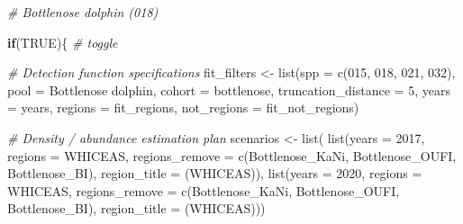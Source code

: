 \documentclass[
]{book}
\newenvironment{Shaded}{\begin{snugshade}}{\end{snugshade}}
\newcommand{\AttributeTok}[1]{\textcolor[rgb]{0.77,0.63,0.00}{#1}}
\newcommand{\CommentTok}[1]{\textcolor[rgb]{0.56,0.35,0.01}{\textit{#1}}}
\newcommand{\ConstantTok}[1]{\textcolor[rgb]{0.00,0.00,0.00}{#1}}
\newcommand{\ControlFlowTok}[1]{\textcolor[rgb]{0.13,0.29,0.53}{\textbf{#1}}}
\newcommand{\DecValTok}[1]{\textcolor[rgb]{0.00,0.00,0.81}{#1}}
\newcommand{\FunctionTok}[1]{\textcolor[rgb]{0.00,0.00,0.00}{#1}}
\newcommand{\NormalTok}[1]{#1}
\newcommand{\OtherTok}[1]{\textcolor[rgb]{0.56,0.35,0.01}{#1}}
\newcommand{\StringTok}[1]{\textcolor[rgb]{0.31,0.60,0.02}{#1}}
\begin{document}
\begin{Shaded}
\begin{Highlighting}[]
\CommentTok{\# Bottlenose dolphin (018)}

\ControlFlowTok{if}\NormalTok{(}\ConstantTok{TRUE}\NormalTok{)\{ }\CommentTok{\# toggle}

  \CommentTok{\# Detection function specifications}
\NormalTok{  fit\_filters }\OtherTok{\textless{}{-}}
    \FunctionTok{list}\NormalTok{(}\AttributeTok{spp =} \FunctionTok{c}\NormalTok{(}\StringTok{\textquotesingle{}015\textquotesingle{}}\NormalTok{, }\StringTok{\textquotesingle{}018\textquotesingle{}}\NormalTok{, }\StringTok{\textquotesingle{}021\textquotesingle{}}\NormalTok{, }\StringTok{\textquotesingle{}032\textquotesingle{}}\NormalTok{),}
         \AttributeTok{pool =} \StringTok{\textquotesingle{}Bottlenose dolphin\textquotesingle{}}\NormalTok{,}
         \AttributeTok{cohort =} \StringTok{\textquotesingle{}bottlenose\textquotesingle{}}\NormalTok{,}
         \AttributeTok{truncation\_distance =} \DecValTok{5}\NormalTok{,}
         \AttributeTok{years =}\NormalTok{ years,}
         \AttributeTok{regions =}\NormalTok{ fit\_regions,}
         \AttributeTok{not\_regions =}\NormalTok{ fit\_not\_regions)}

  \CommentTok{\# Density / abundance estimation plan}
\NormalTok{  scenarios }\OtherTok{\textless{}{-}} \FunctionTok{list}\NormalTok{(}
    \FunctionTok{list}\NormalTok{(}\AttributeTok{years =} \DecValTok{2017}\NormalTok{,}
       \AttributeTok{regions =} \StringTok{\textquotesingle{}WHICEAS\textquotesingle{}}\NormalTok{,}
       \AttributeTok{regions\_remove =} \FunctionTok{c}\NormalTok{(}\StringTok{\textquotesingle{}Bottlenose\_KaNi\textquotesingle{}}\NormalTok{, }\StringTok{\textquotesingle{}Bottlenose\_OUFI\textquotesingle{}}\NormalTok{, }\StringTok{\textquotesingle{}Bottlenose\_BI\textquotesingle{}}\NormalTok{),}
       \AttributeTok{region\_title =} \StringTok{\textquotesingle{}(WHICEAS)\textquotesingle{}}\NormalTok{),}
    \FunctionTok{list}\NormalTok{(}\AttributeTok{years =} \DecValTok{2020}\NormalTok{,}
       \AttributeTok{regions =} \StringTok{\textquotesingle{}WHICEAS\textquotesingle{}}\NormalTok{,}
       \AttributeTok{regions\_remove =} \FunctionTok{c}\NormalTok{(}\StringTok{\textquotesingle{}Bottlenose\_KaNi\textquotesingle{}}\NormalTok{, }\StringTok{\textquotesingle{}Bottlenose\_OUFI\textquotesingle{}}\NormalTok{, }\StringTok{\textquotesingle{}Bottlenose\_BI\textquotesingle{}}\NormalTok{),}
       \AttributeTok{region\_title =} \StringTok{\textquotesingle{}(WHICEAS)\textquotesingle{}}\NormalTok{))}
  

\end{Highlighting}
\end{Shaded}
\end{document}
